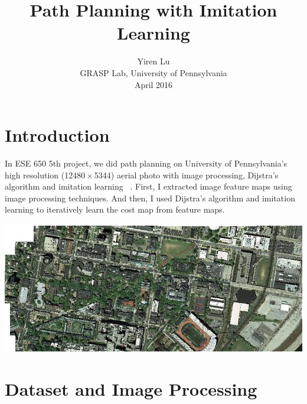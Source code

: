 \documentclass[letterpaper,twocolumn,10pt]{article}
\begin{document}
\date{}

\title{\Large \bf Path Planning with Imitation Learning}

\author{
{\rm Yiren Lu}\\
GRASP Lab, University of Pennsylvania\\
April 2016
}

\maketitle

\thispagestyle{empty}


\section{Introduction}

In ESE 650 5th project, we did path planning on University of Pennsylvania's high resolution (12480 $\times$ 5344) aerial photo with image processing, Dijstra's algorithm and imitation learning ~\cite{ratliff2009learning}. First, I extracted image feature maps using image processing techniques. And then, I used Dijstra's algorithm and imitation learning to iteratively learn the cost map from feature maps.
\begin{center}
\includegraphics[scale=0.28]{imgs/aerial_color_d16.jpg}\\
\end{center}

\section{Dataset and Image Processing}
\end{document}
